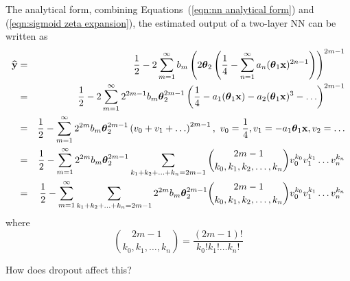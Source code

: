 The analytical form, combining Equations~(\ref{eqn:nn analytical form}) and (\ref{eqn:sigmoid zeta expansion}), the estimated output of a two-layer NN can be written as
\begin{eqnarray}
	\widehat{\bold y} & = & \frac{1}{2} - 2 \sum_{m=1}^\infty b_m \left( 2\boldsymbol\theta_2 \left( \frac{1}{4} - \sum_{n=1}^\infty a_n (\boldsymbol\theta_1 {\bold x})^{2n-1} \right) \right)^{2m - 1} \\
		& = & \frac{1}{2} - 2 \sum_{m=1}^\infty 2^{2m-1} b_m \boldsymbol\theta_2^{2m - 1} \left( \frac{1}{4} - a_1 (\boldsymbol\theta_1 {\bold x}) - a_2 (\boldsymbol\theta_1 {\bold x})^3 - \ldots \right)^{2m - 1} \nonumber \\
		& = & \frac{1}{2} - \sum_{m=1}^\infty 2^{2m} b_m \boldsymbol\theta_2^{2m - 1} \left(v_0 + v_1 + \ldots \right)^{2m - 1},\ v_0 = \frac{1}{4}, v_1 = -a_1 \boldsymbol\theta_1 {\bold x}, v_2 = \ldots \nonumber \\
		& = & \frac{1}{2} - \sum_{m=1}^\infty 2^{2m} b_m \boldsymbol\theta_2^{2m - 1} \sum_{k_1 + k_2 + \ldots + k_n = 2m - 1} \binom{2m-1}{k_0, k_1, k_2, \ldots, k_n} v_0^{k_0} v_1^{k_1} \ldots v_n^{k_n} \nonumber \\
		& = & \frac{1}{2} - \sum_{m=1}^\infty \sum_{k_1 + k_2 + \ldots + k_n = 2m - 1} 2^{2m} b_m \boldsymbol\theta_2^{2m - 1} \binom{2m-1}{k_0, k_1, k_2, \ldots, k_n} v_0^{k_0} v_1^{k_1} \ldots v_n^{k_n}
\end{eqnarray}
where
\[
	\binom{2m-1}{k_0, k_1, \ldots, k_n} = \frac{(2m-1)!}{k_0! k_1! \ldots k_n!}
\]

{\color{red} How does dropout affect this?}
